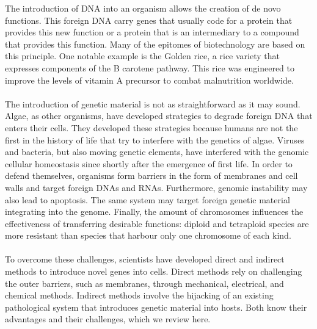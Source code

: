 The introduction of DNA into an organism allows the creation of de novo functions. This foreign DNA carry genes that usually code for a protein that provides this new function or a protein that is an intermediary to a compound that provides this function. Many of the epitomes of biotechnology are based on this principle. One notable example is the Golden rice, a rice variety that expresses components of the Β carotene pathway. This rice was engineered to improve the levels of vitamin A precursor to combat malnutrition worldwide.
\\ \\
The introduction of genetic material is not as straightforward as it may sound. Algae, as other organisms, have developed strategies to degrade foreign DNA that enters their cells. They developed these strategies because humans are not the first in the history of life that try to interfere with the genetics of algae. Viruses and bacteria, but also moving genetic elements, have interfered with the genomic cellular homeostasis since shortly after the emergence of first life. In order to defend themselves, organisms form barriers in the form of membranes and cell walls and target foreign DNAs and RNAs. Furthermore, genomic instability may also lead to apoptosis. The same system may target foreign genetic material integrating into the genome. Finally, the amount of chromosomes influences the effectiveness of transferring desirable functions: diploid and tetraploid species are more resistant than species that harbour only one chromosome of each kind. 
\\ \\
To overcome these challenges, scientists have developed direct and indirect methods to introduce novel genes into cells. Direct methods rely on challenging the outer barriers, such as membranes, through mechanical, electrical, and chemical methods. Indirect methods involve the hijacking of an existing pathological system that introduces genetic material into hosts. Both know their advantages and their challenges, which we review here.

